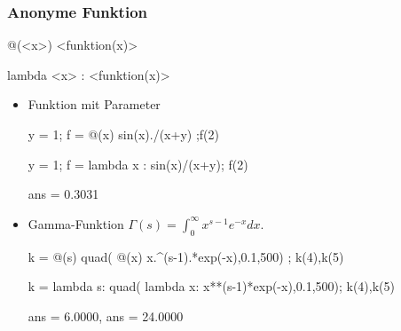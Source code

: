 \documentclass[hyperref={xetex}]{beamer}
\begin{document}
%
%
\begin{frame}[fragile]\frametitle{Anonyme Funktion}
\begin{matlabin}
 @(<x>) <funktion(x)>
\end{matlabin}
\begin{pyin}
lambda <x> : <funktion(x)>  
\end{pyin}

\begin{itemize}
\item Funktion mit Parameter
\begin{matlabin}
y = 1; f = @(x) sin(x)./(x+y) ;f(2)
\end{matlabin}
\begin{pyin}
y = 1; f = lambda x : sin(x)/(x+y); f(2)
\end{pyin}
\begin{matlab}
ans =  0.3031
\end{matlab}

\item Gamma-Funktion $\Gamma(s) = \int_0^\infty x^{s-1} e^{-x} dx$.
\begin{matlabin}
k = @(s) quad( @(x) x.^(s-1).*exp(-x),0.1,500) ; k(4),k(5)
\end{matlabin}
\begin{pyin}
k = lambda s: quad( lambda x: x**(s-1)*exp(-x),0.1,500); k(4),k(5)  
\end{pyin}
\begin{matlab}
ans = 6.0000, ans = 24.0000
\end{matlab}

\end{itemize}
\end{frame}

%
%

\end{document}
